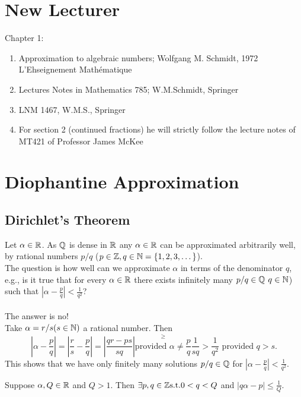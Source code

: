 \documentclass[NumTh.tex]{subfiles}
\begin{document}
\section*{New Lecturer}
Chapter 1:
\begin{enumerate}
  \item Approximation to algebraic numbers; Wolfgang M. Schmidt, 1972 L'Ehseignement Mathématique
  \item Lectures Notes in Mathematics 785; W.M.Schmidt, Springer
  \item LNM 1467, W.M.S., Springer
  \item For section 2 (continued fractions) he will strictly follow the lecture notes of MT421 of Professor James McKee
\end{enumerate}

\section{Diophantine Approximation}

\subsection{Dirichlet's Theorem}

Let $\alpha \in \mathbb{R}$. As $\mathbb{Q}$ is dense in $\mathbb{R}$ any $\alpha \in \mathbb{R}$ can be approximated arbitrarily well, by rational numbers $p/q$ ($p \in \mathbb{Z}, q \in \mathbb{N} = \{1,2,3,\dots\}$).\\
The question is how well can we approximate $\alpha$ in terms of the denominator $q$, e.g., is it true that for every $\alpha \in \mathbb{R}$ there exists infinitely many $p/q \in \mathbb{Q}$ $q\in \mathbb{N}$) such that $| \alpha - \frac{p}{q} | < \frac{1}{q^2}$?\\
\\
The answer is no!\\
Take $\alpha = r/s (s \in \mathbb{N})$ a rational number. Then 
\[ | \alpha - \frac{p}{q} | = |\frac{r}{s} - \frac{p}{q} | = | \frac{qr -ps}{sq} | \overset{\geq}{\text{provided } \alpha \neq \frac{p}{q}} \frac{1}{sq}  > \frac{1}{q^2} \text{ provided } q > s.\]
This shows that we have only finitely many solutions $p/q \in \mathbb{Q}$ for $| \alpha -\frac{p}{q} | < \frac{1}{q^2}$.

\begin{theorem}\label{1_1_1}
  Suppose $\alpha,Q \in \mathbb{R}$ and $Q > 1$. Then $\exists p,q \in \mathbb{Z} \text{s.t.} 0< q<Q$ and $| q\alpha - p | \leq \frac{1}{Q}$.
\end{theorem}
\end{document}
